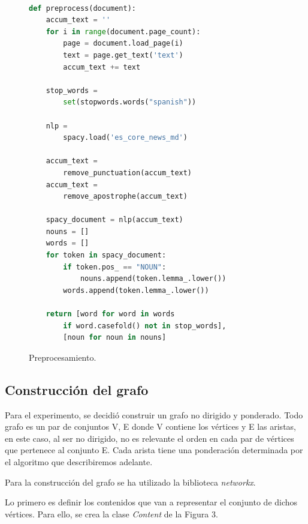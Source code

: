 \documentclass[a4paper,10pt,twocolumn]{article}
\begin{document}
		\begin{figure}[htb]%
			\begin{lstlisting}[language=python]%

def preprocess(document):
    accum_text = ''
    for i in range(document.page_count):
        page = document.load_page(i)
        text = page.get_text('text')
        accum_text += text

    stop_words = 
        set(stopwords.words("spanish"))
    
    nlp = 
        spacy.load('es_core_news_md')

    accum_text = 
        remove_punctuation(accum_text)
    accum_text = 
        remove_apostrophe(accum_text)
    
    spacy_document = nlp(accum_text)
    nouns = []
    words = []
    for token in spacy_document:
        if token.pos_ == "NOUN":
            nouns.append(token.lemma_.lower())
        words.append(token.lemma_.lower())
    
    return [word for word in words 
        if word.casefold() not in stop_words], 
        [noun for noun in nouns]

			\end{lstlisting}
		\caption{Preprocesamiento.\label{fig:code}}
		\end{figure}





            

	\subsection{Construcción del grafo}\label{sub:lists}
 
        Para el experimento, se decidió construir un grafo no dirigido y ponderado. Todo grafo es un par de conjuntos V, E donde V contiene los vértices y E las aristas, en este caso, al ser no dirigido, no es relevante el orden en cada par de vértices que pertenece al conjunto E. Cada arista tiene una ponderación determinada por el algoritmo que describiremos adelante.

        Para la construcción del grafo se ha utilizado la biblioteca \emph{networkx}.
        
        Lo primero es definir los contenidos que van a representar el conjunto de dichos vértices. Para ello, se crea la clase \emph{Content} de la Figura 3.
\end{document}
